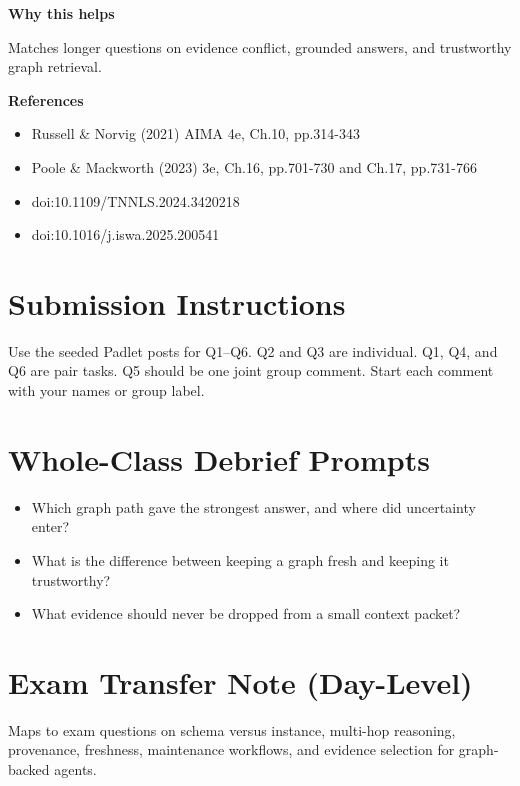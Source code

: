 \documentclass[11pt]{article}
\providecommand{\tightlist}{\setlength{\itemsep}{0pt}\setlength{\parskip}{0pt}}
\begin{document}
\begin{tcolorbox}[colback=white,colframe=MidnightBlue,title={Q6 Exam-Style Constructed Response},fonttitle=\bfseries,breakable]
{\large\bfseries\color{MidnightBlue} Why this helps}\par\medskip
Matches longer questions on evidence conflict, grounded answers, and trustworthy graph retrieval.

{\large\bfseries\color{MidnightBlue} References}\par\medskip
\begin{itemize}\item Russell \& Norvig (2021) AIMA 4e, Ch.10, pp.314-343
\item Poole \& Mackworth (2023) 3e, Ch.16, pp.701-730 and Ch.17, pp.731-766
\item doi:10.1109/TNNLS.2024.3420218
\item doi:10.1016/j.iswa.2025.200541\end{itemize}
\end{tcolorbox}

\section*{Submission Instructions}

Use the seeded Padlet posts for Q1--Q6. Q2 and Q3 are individual. Q1, Q4, and Q6 are pair tasks. Q5 should be one joint group comment. Start each comment with your names or group label.

\section*{Whole-Class Debrief Prompts}

\begin{itemize}
\tightlist
\item
  Which graph path gave the strongest answer, and where did uncertainty enter?
\item
  What is the difference between keeping a graph fresh and keeping it trustworthy?
\item
  What evidence should never be dropped from a small context packet?
\end{itemize}

\section*{Exam Transfer Note (Day-Level)}

Maps to exam questions on schema versus instance, multi-hop reasoning, provenance, freshness, maintenance workflows, and evidence selection for graph-backed agents.
\end{document}
